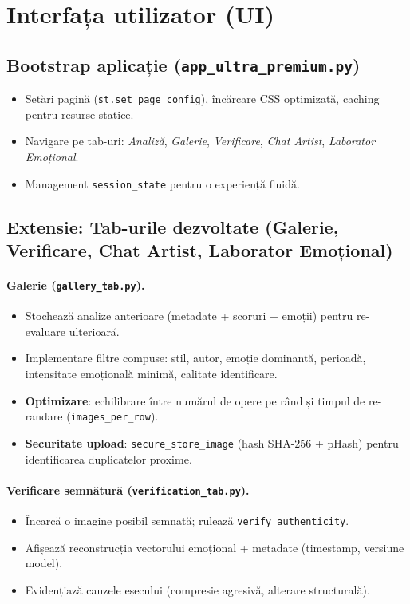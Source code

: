 \section{Interfața utilizator (UI)}\label{sec:ui}

\subsection{Bootstrap aplicație (\texttt{app\_ultra\_premium.py})}
\begin{itemize}
  \item Setări pagină (\texttt{st.set\_page\_config}), încărcare CSS optimizată, caching pentru resurse statice.
  \item Navigare pe tab-uri: \emph{Analiză}, \emph{Galerie}, \emph{Verificare}, \emph{Chat Artist}, \emph{Laborator Emoțional}.
  \item Management \texttt{session\_state} pentru o experiență fluidă.
\end{itemize}

\subsection*{Extensie: Tab-urile dezvoltate (Galerie, Verificare, Chat Artist, Laborator Emoțional)}
\paragraph{Galerie (\texttt{gallery\_tab.py}).} 
\begin{itemize}
  \item Stochează analize anterioare (metadate + scoruri + emoții) pentru re-evaluare ulterioară.
  \item Implementare filtre compuse: stil, autor, emoție dominantă, perioadă, intensitate emoțională minimă, calitate identificare.
  \item \textbf{Optimizare}: echilibrare între numărul de opere pe rând și timpul de re-randare (\texttt{images\_per\_row}).
  \item \textbf{Securitate upload}: \texttt{secure\_store\_image} (hash SHA-256 + pHash) pentru identificarea duplicatelor proxime.
\end{itemize}

\paragraph{Verificare semnătură (\texttt{verification\_tab.py}).}
\begin{itemize}
  \item Încarcă o imagine posibil semnată; rulează \texttt{verify\_authenticity}.
  \item Afișează reconstrucția vectorului emoțional + metadate (timestamp, versiune model).
  \item Evidențiază cauzele eșecului (compresie agresivă, alterare structurală).
\end{itemize}


